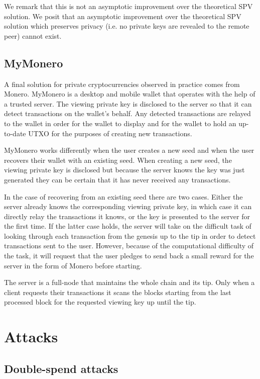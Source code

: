 \documentclass[sigconf,authordraft]{acmart}
\begin{document}
We remark that this is not an asymptotic improvement over the theoretical SPV solution. We posit that an asymptotic improvement over the theoretical SPV solution which preserves privacy (i.e. no private keys are revealed to the remote peer) cannot exist.
\subsection{MyMonero}
A final solution for private cryptocurrencies observed in practice comes from Monero. MyMonero is a desktop and mobile wallet that operates with the help of a trusted server. The viewing private key is disclosed to the server so that it can detect transactions on the wallet's behalf. Any detected transactions are relayed to the wallet in order for the wallet to display and for the wallet to hold an up-to-date UTXO for the purposes of creating new transactions.

MyMonero works differently when the user creates a new seed and when the user recovers their wallet with an existing seed. When creating a new seed, the viewing private key is disclosed but because the server knows the key was just generated they can be certain that it has never received any transactions.

In the case of recovering from an existing seed there are two cases. Either the server already knows the corresponding viewing private key, in which case it can directly relay the transactions it knows, or the key is presented to the server for the first time. If the latter case holds, the server will take on the difficult task of looking through each transaction from the genesis up to the tip in order to detect transactions sent to the user. However, because of the computational difficulty of the task, it will request that the user pledges to send back a small reward for the server in the form of Monero before starting.

The server is a full-node that maintains the whole chain and its tip. Only when a client requests their transactions it scans the blocks starting from the last processed block for the requested viewing key up until the tip.

\section{Attacks}
\subsection{Double-spend attacks}
\end{document}
